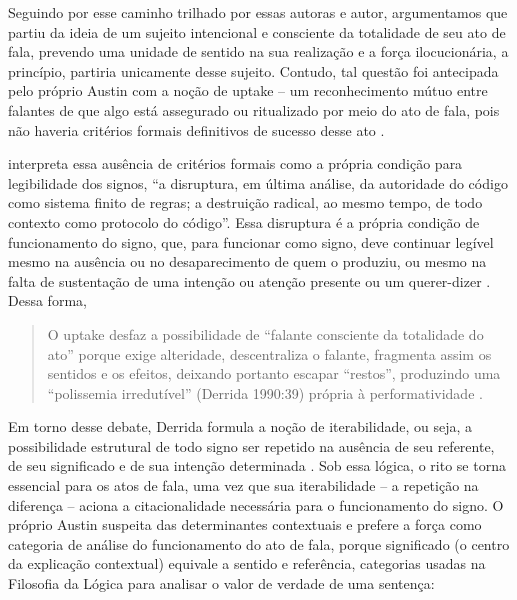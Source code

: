 \documentclass[portuguese]{textolivre}
\begin{document}
Seguindo por esse caminho trilhado por essas autoras e autor, argumentamos que \textcite{austin1962how} partiu da ideia de um sujeito intencional e consciente da totalidade de seu ato de fala, prevendo uma unidade de sentido na sua realização e a força ilocucionária, a princípio, partiria unicamente desse sujeito. Contudo, tal questão foi antecipada pelo próprio Austin com a noção de uptake – um reconhecimento mútuo entre falantes de que algo está assegurado ou ritualizado por meio do ato de fala, pois não haveria critérios formais definitivos de sucesso desse ato \textcite[p. 120–146]{austin1962how}.

\textcite[p. 28]{derrida1990limited} interpreta essa ausência de critérios formais como a própria condição para legibilidade dos signos, “a disruptura, em última análise, da autoridade do código como sistema finito de regras; a destruição radical, ao mesmo tempo, de todo contexto como protocolo do código”. Essa disruptura é a própria condição de funcionamento do signo, que, para funcionar como signo, deve continuar legível mesmo na ausência ou no desaparecimento de quem o produziu, ou mesmo na falta de sustentação de uma intenção ou atenção presente ou um querer-dizer \cite[p. 29]{derrida1990limited}. Dessa forma,

\begin{quote}
    O uptake desfaz a possibilidade de “falante consciente da totalidade do ato” porque exige alteridade, descentraliza o falante, fragmenta assim os sentidos e os efeitos, deixando portanto escapar “restos”, produzindo uma “polissemia irredutível” (Derrida 1990:39) própria à performatividade \cite[p. 8]{pinto2007conexoes}.
\end{quote}

Em torno desse debate, Derrida formula a noção de iterabilidade, ou seja, a possibilidade estrutural de todo signo ser repetido na ausência de seu referente, de seu significado e de sua intenção determinada \cite{derrida1990limited,pinto2009corpo}. Sob essa lógica, o rito se torna essencial para os atos de fala, uma vez que sua iterabilidade – a repetição na diferença – aciona a citacionalidade necessária para o funcionamento do signo. O próprio Austin suspeita das determinantes contextuais e prefere a força como categoria de análise do funcionamento do ato de fala, porque significado (o centro da explicação contextual) equivale a sentido e referência, categorias usadas na Filosofia da Lógica para analisar o valor de verdade de uma sentença:
\end{document}
